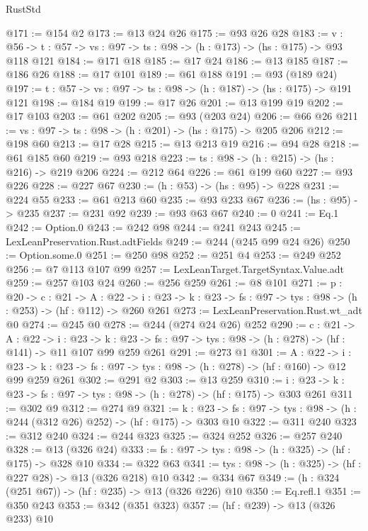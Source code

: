 \begin{lexlean}{RustStd}
\begin{coremodule}
@171 := @154 @2
@173 := @13 @24 @26
@175 := @93 @26 @28
@183 := {v : @56} ->
  {t : @57} -> {vs : @97} -> {ts : @98} -> (h : @173) -> (hs : @175) -> @93 @118 @121
@184 := @171 @18
@185 := @17 @24
@186 := @13 @185
@187 := @186 @26
@188 := @17 @101
@189 := @61 @188
@191 := @93 (@189 @24)
@197 := {t : @57} -> {vs : @97} -> {ts : @98} -> (h : @187) -> (hs : @175) -> @191 @121
@198 := @184 @19
@199 := @17 @26
@201 := @13 @199 @19
@202 := @17 @103
@203 := @61 @202
@205 := @93 (@203 @24)
@206 := @66 @26
@211 := {vs : @97} -> {ts : @98} -> (h : @201) -> (hs : @175) -> @205 @206
@212 := @198 @60
@213 := @17 @28
@215 := @13 @213 @19
@216 := @94 @28
@218 := @61 @185 @60
@219 := @93 @218
@223 := {ts : @98} -> (h : @215) -> (hs : @216) -> @219 @206
@224 := @212 @64
@226 := @61 @199 @60
@227 := @93 @226
@228 := @227 @67
@230 := (h : @53) -> (hs : @95) -> @228
@231 := @224 @55
@233 := @61 @213 @60
@235 := @93 @233 @67
@236 := (hs : @95) -> @235
@237 := @231 @92
@239 := @93 @63 @67
@240 := 0
@241 := Eq.{1}
@242 := Option.{0}
@243 := @242 @98
@244 := @241 @243
@245 := LexLeanPreservation.Rust.adtFields
@249 := @244 (@245 @99 @24 @26)
@250 := Option.some.{0}
@251 := @250 @98
@252 := @251 @4
@253 := @249 @252
@256 := @7 @113 @107 @99
@257 := LexLeanTarget.TargetSyntax.Value.adt
@259 := @257 @103 @24
@260 := @256 @259
@261 := @8 @101
@271 := {p : @20} ->
  {c : @21} ->
  {A : @22} ->
  {i : @23} -> {k : @23} -> {fs : @97} -> {tys : @98} -> (h : @253) -> (hf : @112) -> @260 @261
@273 := LexLeanPreservation.Rust.wt_adt @0
@274 := @245 @0
@278 := @244 (@274 @24 @26) @252
@290 := {c : @21} ->
  {A : @22} ->
  {i : @23} ->
  {k : @23} -> {fs : @97} -> {tys : @98} -> (h : @278) -> (hf : @141) -> @11 @107 @99 @259 @261
@291 := @273 @1
@301 := {A : @22} ->
  {i : @23} ->
  {k : @23} -> {fs : @97} -> {tys : @98} -> (h : @278) -> (hf : @160) -> @12 @99 @259 @261
@302 := @291 @2
@303 := @13 @259
@310 := {i : @23} ->
  {k : @23} -> {fs : @97} -> {tys : @98} -> (h : @278) -> (hf : @175) -> @303 @261
@311 := @302 @9
@312 := @274 @9
@321 := {k : @23} ->
  {fs : @97} -> {tys : @98} -> (h : @244 (@312 @26) @252) -> (hf : @175) -> @303 @10
@322 := @311 @240
@323 := @312 @240
@324 := @244 @323
@325 := @324 @252
@326 := @257 @240
@328 := @13 (@326 @24)
@333 := {fs : @97} -> {tys : @98} -> (h : @325) -> (hf : @175) -> @328 @10
@334 := @322 @63
@341 := {tys : @98} -> (h : @325) -> (hf : @227 @28) -> @13 (@326 @218) @10
@342 := @334 @67
@349 := (h : @324 (@251 @67)) -> (hf : @235) -> @13 (@326 @226) @10
@350 := Eq.refl.{1}
@351 := @350 @243
@353 := @342 (@351 @323)
@357 := (hf : @239) -> @13 (@326 @233) @10

\end{coremodule}
\end{lexlean}
